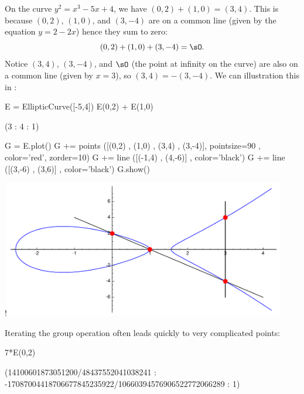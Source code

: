 \begin{example}\label{ex:ecgplaw}
  On the curve $y^2=x^3-5x+4$, we have $(0,2) + (1,0) = (3,4)$.
  This is because $(0,2)$, $(1,0)$, and $(3,-4)$ are on a common line
  (given by the equation $y = 2 - 2x$) hence they sum to zero:
  \[
    (0,2) + (1,0) + (3,-4) = \sO.
  \]
  Notice $(3,4)$, $(3,-4)$, and $\sO$ (the point at infinity on the curve)
  are also on a common line (given by $x = 3$), so $(3,4)=-(3,-4)$.
  We can illustration this in {\Sage}:
\begin{sagecode}
\begin{sagecell}
E = EllipticCurve([-5,4])
E(0,2) + E(1,0)
\end{sagecell}
\begin{sageout}
(3 : 4 : 1)
\end{sageout}
\end{sagecode} %
\begin{sagecode}
\begin{sagecell} %
G = E.plot()
G += points ([(0,2) , (1,0) , (3,4) , (3,-4)],
pointsize=90 , color='red', zorder=10)
G += line ([(-1,4) , (4,-6)] , color='black')
G += line ([(3,-6) , (3,6)] , color='black')
G.show()
\end{sagecell}
\begin{sageout}[escapechar=!] %
!\includegraphics[width=0.925\textwidth]{img/grouplaw}
\end{sageout}
\end{sagecode} %
  
  \noindent
  Iterating the group operation often leads quickly to
  very complicated points:
  
\begin{sagecode}
\begin{sagecell}
7*E(0,2)
\end{sagecell}
\begin{sageout}
(14100601873051200/48437552041038241 :
-17087004418706677845235922/10660394576906522772066289 :
1)
\end{sageout}
\end{sagecode}
\end{example}

